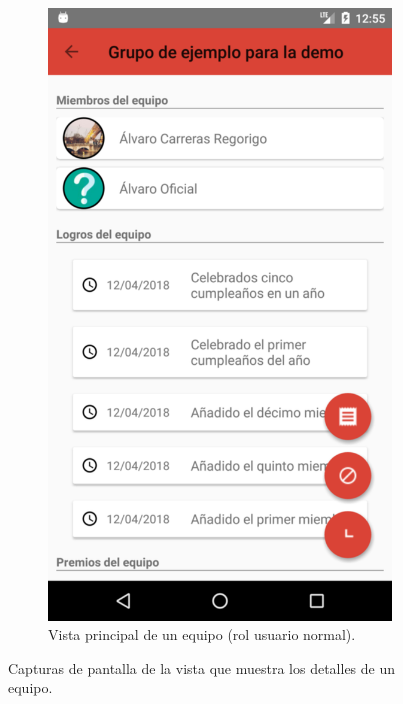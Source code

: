 \documentclass[twoside]{report}
\begin{document}
\begin{figure}[H]
\begin{center}
\begin{subfigure}[t]{.3\linewidth}
		\includegraphics[scale=0.2]{images/userguide/16.png}
		\caption{Vista principal de un equipo (rol usuario normal).}
	\end{subfigure}\hspace{2mm}%
\caption{Capturas de pantalla de la vista que muestra los detalles de un equipo.}
\end{center}
\end{figure}
\end{document}
